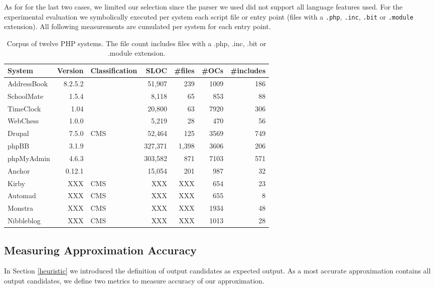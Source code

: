 \documentclass[preprint]{sig-alternate-05-2015}
\begin{document}
As for for the last two cases, we limited our selection since the parser we
used did not support all language features used. For the experimental evaluation we symbolically executed per system each script file or entry point (files with a \texttt{.php}, \texttt{.inc}, \texttt{.bit} or \texttt{.module} extension). All following measurements are cumulated per system for each entry point. 

\begin{table}[t]
\centering 
	\begin{tabular}{lrp{4cm}rrrr}
	\toprule
	\textbf{System} & \textbf{Version} & \textbf{Classification} & \textbf{SLOC} &
	\textbf{\#files} & \textbf{\#OCs} & \textbf{\#includes}
	\\
	\midrule
	AddressBook & 8.2.5.2 &  & 51,907 & 239  & 1009 & 186\\
	SchoolMate & 1.5.4 &  & 8,118 & 65  & 853 & 88\\
	TimeClock & 1.04 &  & 20,800 & 63  & 7920 & 306\\
	WebChess & 1.0.0 &  & 5,219 & 28  & 470 & 56\\
	\midrule
	Drupal & 7.5.0 & CMS & 52,464 & 125  & 3569 & 749\\
	phpBB & 3.1.9 &  & 327,371 & 1,398  & 3606 & 206\\
	phpMyAdmin & 4.6.3 &  & 303,582 & 871  & 7103 & 571\\
	\midrule
	Anchor & 0.12.1 &  & 15,054 & 201 & 987 & 32\\
	Kirby & XXX & CMS & XXX & XXX  & 654 & 23\\
	Automad & XXX & CMS & XXX & XXX  & 655 & 8\\
	Monstra & XXX & CMS & XXX & XXX  & 1934 & 48\\
	Nibbleblog & XXX & CMS & XXX & XXX  & 1013 & 28\\
	\bottomrule
	\end{tabular}
	\caption{Corpus of twelve PHP systems. The file count includes files with a .php,
	.inc, .bit or .module extension.}
	\label{corpus}
\end{table}


\subsection{Measuring Approximation Accuracy}
\label{HowAccurateIsOurApproximation} 
In Section \ref{heuristic} we introduced the definition of output candidates as
expected output. As a most accurate approximation contains all output
candidates, we define two metrics to measure accuracy of our approximation.
\end{document}
